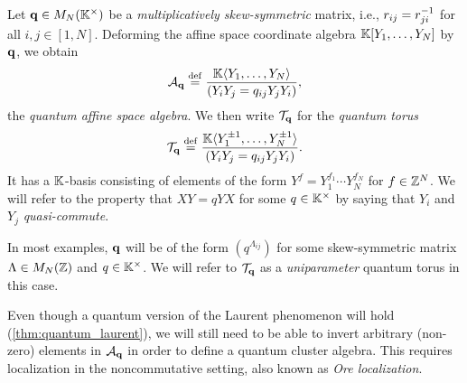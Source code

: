 Let $\mathbf{q} \in M_N(\mathbb{K}^\times)$ be a \emph{multiplicatively
	skew-symmetric} matrix, i.e., $r_{ij} =
	r_{ji}^{-1}$ for all $i,j \in [1, N]$. Deforming the affine space coordinate algebra
$\mathbb{K}[Y_1, \dots, Y_N]$ by $\mathbf{q}$, we obtain
\begin{equation*}
	\mathcal{A}_{\mathbf{q}} \overset{\mathrm{def}}{=} \frac{\mathbb{K} \langle Y_1 , \dots, Y_N\rangle}{(Y_i Y_j = q_{ij}Y_j Y_i)},
\end{equation*}
%
%
the \emph{quantum affine space algebra}. We then
write $\mathcal{T}_{\mathbf{q}}$ for the \emph{quantum torus}
\begin{equation}\label{eq:quantum_torus}
	\mathcal{T}_{\mathbf{q}} \overset{\mathrm{def}}{=} \frac{\mathbb{K} \langle Y_1^{\pm 1} , \dots, Y_N^{\pm 1}\rangle}{(Y_i Y_j = q_{ij}Y_j Y_i)}.
\end{equation}
%
It has a $\mathbb{K}$-basis consisting of elements of the form $Y^f = Y_1^{f_1} \cdots
	Y_N^{f_N}$ for $f \in \mathbb{Z}^N$. We will refer to the property that $X Y = qY X$ for some
$q \in \mathbb{K}^\times$ by saying that $Y_i$ and $Y_j$
\emph{quasi-commute}.
\begin{remark}

	In most examples, $\mathbf{q}$ will be of the form $(q^{\Lambda_{ij}})$ for some
	skew-symmetric matrix $\Lambda \in M_N(\mathbb{Z})$ and $q\in \mathbb{K}^\times$. We will refer to
	$\mathcal{T}_{\mathbf{q}}$ as a \emph{uniparameter} quantum torus in this case.
\end{remark}
%

Even though a quantum version of the Laurent phenomenon will hold
(\cref{thm:quantum_laurent}), we will still need to be able to invert arbitrary
(non-zero) elements in $\mathcal{A}_{\mathbf{q}}$ in order to define a quantum cluster algebra. This
requires localization in the noncommutative setting, also known as \emph{Ore
	localization}.

